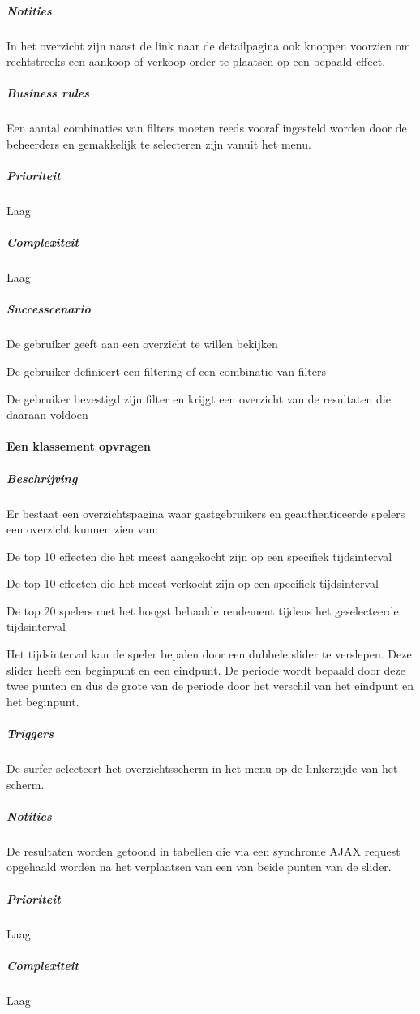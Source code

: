 \begin{compact}
\subparagraph{Notities}In het overzicht zijn naast de link naar de detailpagina ook knoppen voorzien om rechtstreeks een aankoop of verkoop order te plaatsen op een bepaald effect.
\subparagraph{Business rules}Een aantal combinaties van filters moeten reeds vooraf ingesteld worden door de beheerders en gemakkelijk te selecteren zijn vanuit het menu.
\subparagraph{Prioriteit}Laag
\subparagraph{Complexiteit}Laag
\subparagraph{Successcenario}
\begin{enumerate_compact}
 \item De gebruiker geeft aan een overzicht te willen bekijken
 \item De gebruiker definieert een filtering of een combinatie van filters
 \item De gebruiker bevestigd zijn filter en krijgt een overzicht van de resultaten die daaraan voldoen
\end{enumerate_compact}
\end{compact}

\paragraph{Een klassement opvragen}
\begin{compact}

\subparagraph{Beschrijving} Er bestaat een overzichtspagina waar gastgebruikers en geauthenticeerde spelers een overzicht kunnen zien van:
\begin{itemize_compact}
	\item De top 10 effecten die het meest aangekocht zijn op een specifiek tijdsinterval
	\item De top 10 effecten die het meest verkocht zijn op een specifiek tijdsinterval
	\item De top 20 spelers met het hoogst behaalde rendement tijdens het geselecteerde tijdsinterval
\end{itemize_compact}
Het tijdsinterval kan de speler bepalen door een dubbele slider te verslepen. Deze slider heeft een beginpunt en een eindpunt. De periode wordt bepaald door deze twee punten en dus de grote van de periode door het verschil van het eindpunt en het beginpunt.
\subparagraph{Triggers} De surfer selecteert het overzichtsscherm in het menu op de linkerzijde van het scherm.
\subparagraph{Notities} De resultaten worden getoond in tabellen die via een synchrome AJAX request opgehaald worden na het verplaatsen van een van beide punten van de slider.
\subparagraph{Prioriteit}Laag
\subparagraph{Complexiteit}Laag
\end{compact}

